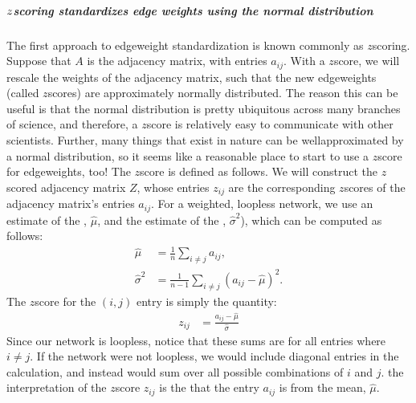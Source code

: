 \documentclass[letterpaper,10pt,english]{jupyterBook}
\begin{document}
\subparagraph{\protect\(z\protect\)\sphinxhyphen{}scoring standardizes edge weights using the normal distribution}
\label{\detokenize{representations/ch4/regularization:z-scoring-standardizes-edge-weights-using-the-normal-distribution}}
\sphinxAtStartPar
The first approach to edge\sphinxhyphen{}weight standardization is known commonly as \(z\)\sphinxhyphen{}scoring. Suppose that \(A\) is the adjacency matrix, with entries \(a_{ij}\). With a \(z\)\sphinxhyphen{}score, we will rescale the weights of the adjacency matrix, such that the new edge\sphinxhyphen{}weights (called \(z\)\sphinxhyphen{}scores) are approximately normally distributed. The reason this can be useful is that the normal distribution is pretty ubiquitous across many branches of science, and therefore, a \(z\)\sphinxhyphen{}score is relatively easy to communicate with other scientists. Further, many things that exist in nature can be well\sphinxhyphen{}approximated by a normal distribution, so it seems like a reasonable place to start to use a \(z\)\sphinxhyphen{}score for edge\sphinxhyphen{}weights, too! The \(z\)\sphinxhyphen{}score is defined as follows. We will construct the \(z\)\sphinxhyphen{}scored adjacency matrix \(Z\), whose entries \(z_{ij}\) are the corresponding \(z\)\sphinxhyphen{}scores of the adjacency matrix’s entries \(a_{ij}\). For a weighted, loopless network, we use an estimate of the , \(\hat \mu\), and the  estimate of the , \(\hat \sigma^2\)), which can be computed as follows:
\begin{align*}
    \hat\mu &= \frac{1}{n}\sum_{i \neq j}a_{ij},\\
    \hat\sigma^2 &= \frac{1}{n - 1}\sum_{i \neq j} (a_{ij} - \hat\mu)^2.
\end{align*}
\sphinxAtStartPar
The \(z\)\sphinxhyphen{}score for the \((i,j)\) entry is simply the quantity:
\begin{align*}
    z_{ij} &= \frac{a_{ij} - \hat\mu}{\hat\sigma}
\end{align*}
\sphinxAtStartPar
Since our network is loopless, notice that these sums are for all  entries where \(i \neq j\). If the network were not loopless, we would include diagonal entries in the calculation, and instead would sum over all possible combinations of \(i\) and \(j\). the interpretation of the \(z\)\sphinxhyphen{}score \(z_{ij}\) is the  that the entry \(a_{ij}\) is from the mean, \(\hat \mu\).
\end{document}

